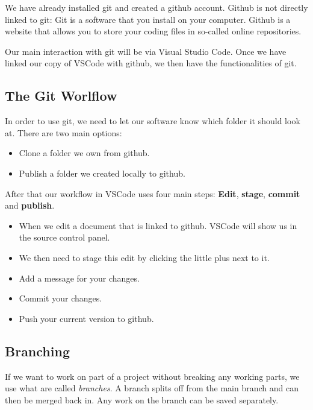 \documentclass[english,11pt,a4paper]{report}
\begin{document}
We have already installed git and created a github account. Github is not directly linked to git: Git is a software that you install on your computer. Github is a website that allows you to store your coding files in so-called online repositories.

Our main interaction with git will be via Visual Studio Code. Once we have linked our copy of VSCode with github, we then have the functionalities of git.

\subsection{The Git Worlflow}
In order to use git, we need to let our software know which folder it should look at. There are two main options:
\begin{itemize}
\item Clone a folder we own from github.
\item Publish a folder we created locally to github.
\end{itemize}

\newpage

After that our workflow in VSCode uses four main steps: {\bf Edit}, {\bf stage}, {\bf commit} and {\bf publish}.
\begin{itemize}
\item When we edit a document that is linked to github. VSCode will show us in the source control panel.
\item We then need to stage this edit by clicking the little plus next to it.
\item Add a message for your changes.
\newpage
\item Commit your changes.
\item Push your current version to github.
\end{itemize}

\subsection{Branching}

If we want to work on part of a project without breaking any working parts, we use what are called \emph{branches}. A branch splits off from the main branch and can then be merged back in. Any work on the branch can be saved separately.

\newpage
\end{document}
